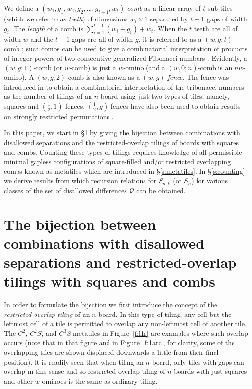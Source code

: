 \documentclass[preprint,3p]{elsarticle}
\begin{document}
We define a \textit{$(w_1,g_1,w_2,g_2,\ldots,g_{t-1},w_t)$-comb} as a
linear array of $t$ sub-tiles (which we refer to as \textit{teeth}) of
dimensions $w_i\times1$ separated by $t-1$ gaps of width $g_i$.  The
\textit{length} of a comb is $\sum_{i=1}^{t-1}(w_i+g_i)+w_t$.
When the $t$ teeth are all of width $w$ and the $t-1$
gaps are all of width $g$, it is referred to as a $(w,g;t)$-comb \cite{AE23};
such combs can be used to give a combinatorial interpretation of
products of integer powers of two consecutive generalized Fibonacci
numbers \cite{AE24}. Evidently, a $(w,g;1)$-comb (or $w$-comb)
is just a $w$-omino (and a $(w,0;n)$-comb is an $nw$-omino).  A
$(w,g;2)$-comb is also known as a \textit{$(w,g)$-fence}.  The fence
was introduced in \cite{Edw08} to obtain a combinatorial
interpretation of the tribonacci numbers as the number of tilings of
an $n$-board using just two types of tiles, namely, squares and
$(\frac12,1)$-fences. $(\frac12,g)$-fences have also been used to
obtain results on strongly restricted permutations \cite{EA15}.

In this paper, we start in \S\ref{s:bij} by giving the bijection
between combinations with disallowed separations and the
restricted-overlap tilings of boards with squares and combs. Counting
these types of tilings requires knowledge of all permissible minimal
gapless configurations of square-filled and/or restricted overlapping
combs known as metatiles which are introduced in
\S\ref{s:metatiles}. In \S\ref{s:counting} we derive results from
which recursion relations for $S_{n,k}$ (or $S_n$) for various classes
of the set of disallowed differences $\mathcal{Q}$ can be obtained.

\section{The bijection between combinations with disallowed
  separations and restricted-overlap tilings with squares and 
combs}\label{s:bij}

In order to formulate the bijection we first introduce the concept of
the \textit{restricted-overlap tiling} of an $n$-board. In this type of
tiling, any cell but the leftmost cell of a tile is permitted to
overlap any non-leftmost cell of another tile. The $C^2$, $C^2S$, and
$C^3S$ metatiles in Figure~\ref{f:l1r} are examples where such
overlap occurs (note that in that figure and in Figure~\ref{f:1arc},
for clarity,
some of the
  overlapping tiles are shown displaced downwards a little from their
  final position).
It is readily seen that when tiling an $n$-board,
only tiles with gaps can
overlap in this sense and so restricted-overlap tiling of $n$-boards with just
squares and other $w$-ominoes is the same as ordinary tiling.
\end{document}
